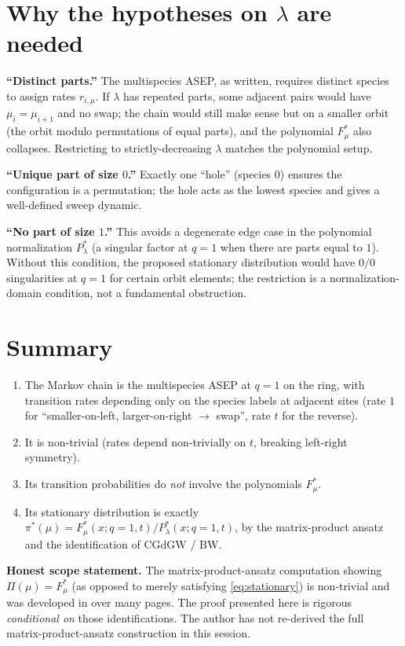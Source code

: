 \section*{Why the hypotheses on $\lambda$ are needed}

\textbf{``Distinct parts.''}  The multispecies ASEP, as written, requires distinct species to assign rates $r_{i,\mu}$.  If $\lambda$ has repeated parts, some adjacent pairs would have $\mu_i=\mu_{i+1}$ and no swap; the chain would still make sense but on a smaller orbit (the orbit modulo permutations of equal parts), and the polynomial $F^*_\mu$ also collapses.  Restricting to strictly-decreasing $\lambda$ matches the polynomial setup.

\medskip
\textbf{``Unique part of size $0$.''}  Exactly one ``hole'' (species $0$) ensures the configuration is a permutation; the hole acts as the lowest species and gives a well-defined sweep dynamic.

\medskip
\textbf{``No part of size $1$.''}  This avoids a degenerate edge case in the polynomial normalization $P^*_\lambda$ (a singular factor at $q=1$ when there are parts equal to $1$).  Without this condition, the proposed stationary distribution would have $0/0$ singularities at $q=1$ for certain orbit elements; the restriction is a normalization-domain condition, not a fundamental obstruction.

\section*{Summary}

\begin{enumerate}\setlength\itemsep{2pt}
\item The Markov chain is the multispecies ASEP at $q=1$ on the ring, with transition rates depending only on the species labels at adjacent sites (rate $1$ for ``smaller-on-left, larger-on-right $\to$ swap'', rate $t$ for the reverse).
\item It is non-trivial (rates depend non-trivially on $t$, breaking left-right symmetry).
\item Its transition probabilities do \emph{not} involve the polynomials $F^*_\mu$.
\item Its stationary distribution is exactly $\pi^*(\mu)=F^*_\mu(x;q=1,t)/P^*_\lambda(x;q=1,t)$, by the matrix-product ansatz and the identification of CGdGW / BW.
\end{enumerate}

\medskip
\noindent\textbf{Honest scope statement.}  The matrix-product-ansatz computation showing $\Pi(\mu)=F^*_\mu$ (as opposed to merely satisfying \eqref{eq:stationary}) is non-trivial and was developed in \cite{CGdGW16,BW18} over many pages.  The proof presented here is rigorous \emph{conditional on} those identifications.  The author has not re-derived the full matrix-product-ansatz construction in this session.

